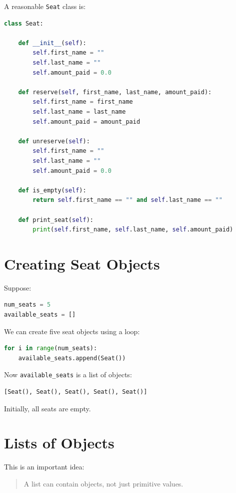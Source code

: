 \documentclass[11pt]{article}
\begin{document}
A reasonable \texttt{Seat} class is:

\begin{lstlisting}[language=Python]
class Seat:

    def __init__(self):
        self.first_name = ""
        self.last_name = ""
        self.amount_paid = 0.0

    def reserve(self, first_name, last_name, amount_paid):
        self.first_name = first_name
        self.last_name = last_name
        self.amount_paid = amount_paid

    def unreserve(self):
        self.first_name = ""
        self.last_name = ""
        self.amount_paid = 0.0

    def is_empty(self):
        return self.first_name == "" and self.last_name == ""

    def print_seat(self):
        print(self.first_name, self.last_name, self.amount_paid)
\end{lstlisting}

\section{Creating Seat Objects}

Suppose:

\begin{lstlisting}[language=Python]
num_seats = 5
available_seats = []
\end{lstlisting}

We can create five seat objects using a loop:

\begin{lstlisting}[language=Python]
for i in range(num_seats):
    available_seats.append(Seat())
\end{lstlisting}

Now \texttt{available\_seats} is a list of objects:

\begin{lstlisting}[language=Python]
[Seat(), Seat(), Seat(), Seat(), Seat()]
\end{lstlisting}

Initially, all seats are empty.

\section{Lists of Objects}

This is an important idea:

\begin{quote}
A list can contain objects, not just primitive values.
\end{quote}
\end{document}
